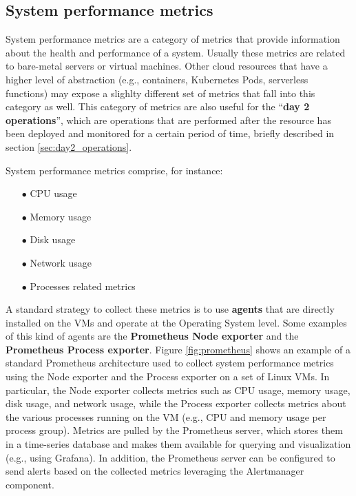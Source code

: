 \subsection{System performance metrics}

System performance metrics are a category of metrics that provide information about the health and performance of a system.
Usually these metrics are related to bare-metal servers or virtual machines.
Other cloud resources that have a higher level of abstraction (e.g., containers, Kubernetes Pods, serverless functions) may expose a slighlty different set of metrics that fall into this category as well.
This category of metrics are also useful for the ``\textbf{day 2 operations}'', which are operations that are performed after the resource has been deployed and monitored for a certain period of time, briefly described in section \ref{sec:day2_operations}.

System performance metrics comprise, for instance:
\begin{itemize}[itemsep=0.2pt, topsep=1pt]
  \item[$\bullet$] CPU usage
  \item[$\bullet$] Memory usage
  \item[$\bullet$] Disk usage
  \item[$\bullet$] Network usage
  \item[$\bullet$] Processes related metrics \\
\end{itemize}

A standard strategy to collect these metrics is to use \textbf{agents} that are directly installed on the VMs and operate at the Operating System level.
Some examples of this kind of agents are the \textbf{Prometheus Node exporter} and the \textbf{Prometheus Process exporter}.
Figure \ref{fig:prometheus} shows an example of a standard Prometheus architecture used to collect system performance metrics using the Node exporter and the Process exporter on a set of Linux VMs.
In particular, the Node exporter collects metrics such as CPU usage, memory usage, disk usage, and network usage, while the Process exporter collects metrics about the various processes running on the VM (e.g., CPU and memory usage per process group).
Metrics are pulled by the Prometheus server, which stores them in a time-series database and makes them available for querying and visualization (e.g., using Grafana). 
In addition, the Prometheus server can be configured to send alerts based on the collected metrics leveraging the Alertmanager component. \newline

